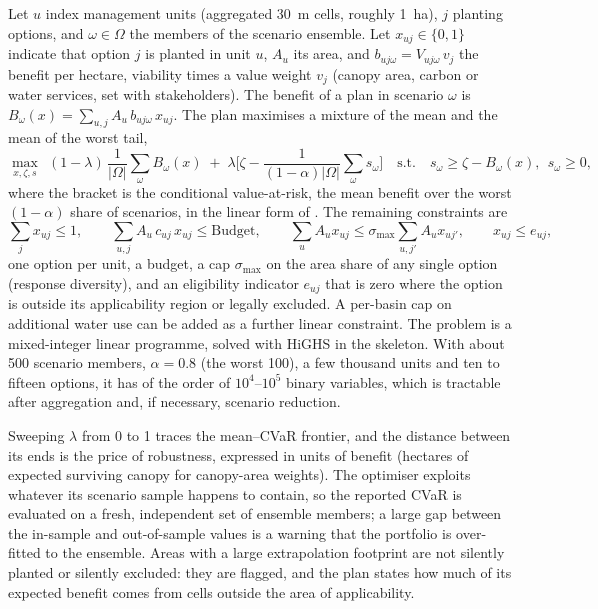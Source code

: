 Let $u$ index management units (aggregated 30~m cells, roughly 1~ha), $j$ planting options, and $\omega\in\Omega$ the members of the scenario ensemble. Let $x_{uj}\in\{0,1\}$ indicate that option $j$ is planted in unit $u$, $A_u$ its area, and $b_{uj\omega}=V_{uj\omega}\,v_j$ the benefit per hectare, viability times a value weight $v_j$ (canopy area, carbon or water services, set with stakeholders). The benefit of a plan in scenario $\omega$ is $B_\omega(x)=\sum_{u,j}A_u\,b_{uj\omega}\,x_{uj}$. The plan maximises a mixture of the mean and the mean of the worst tail,
\begin{equation}\label{eq:cvar}
\max_{x,\zeta,s}\ \ (1-\lambda)\,\frac1{|\Omega|}\sum_\omega B_\omega(x)\;+\;\lambda\Big[\zeta-\frac{1}{(1-\alpha)|\Omega|}\sum_\omega s_\omega\Big]\quad\text{s.t.}\quad s_\omega\ge\zeta-B_\omega(x),\ \ s_\omega\ge0,
\end{equation}
where the bracket is the conditional value-at-risk, the mean benefit over the worst $(1-\alpha)$ share of scenarios, in the linear form of \citet{Rockafellar2000}. The remaining constraints are
\begin{equation}\label{eq:mip}
\sum_j x_{uj}\le1,\qquad \sum_{u,j}A_u\,c_{uj}\,x_{uj}\le\mathrm{Budget},\qquad \sum_uA_u x_{uj}\le\sigma_{\max}\sum_{u,j'}A_u x_{uj'},\qquad x_{uj}\le e_{uj},
\end{equation}
one option per unit, a budget, a cap $\sigma_{\max}$ on the area share of any single option (response diversity), and an eligibility indicator $e_{uj}$ that is zero where the option is outside its applicability region or legally excluded. A per-basin cap on additional water use can be added as a further linear constraint. The problem is a mixed-integer linear programme, solved with HiGHS in the skeleton. With about 500 scenario members, $\alpha=0.8$ (the worst 100), a few thousand units and ten to fifteen options, it has of the order of $10^4$--$10^5$ binary variables, which is tractable after aggregation and, if necessary, scenario reduction.

Sweeping $\lambda$ from 0 to 1 traces the mean--CVaR frontier, and the distance between its ends is the price of robustness, expressed in units of benefit (hectares of expected surviving canopy for canopy-area weights). The optimiser exploits whatever its scenario sample happens to contain, so the reported CVaR is evaluated on a fresh, independent set of ensemble members; a large gap between the in-sample and out-of-sample values is a warning that the portfolio is over-fitted to the ensemble. Areas with a large extrapolation footprint are not silently planted or silently excluded: they are flagged, and the plan states how much of its expected benefit comes from cells outside the area of applicability.

